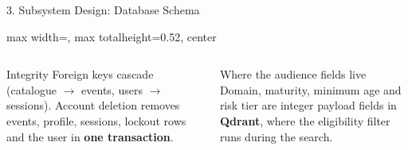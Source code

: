 \documentclass[aspectratio=169, 11pt]{beamer}
\begin{document}
\begin{frame}{3. Subsystem Design: Database Schema}
\begin{adjustbox}{max width=\textwidth, max totalheight=0.52\textheight, center}
\end{adjustbox}

    \vspace{0.2cm}
    \begin{columns}[T]
        \begin{block}{Integrity}
            \scriptsize Foreign keys cascade (catalogue $\rightarrow$ events, users $\rightarrow$ sessions). Account deletion removes events, profile, sessions, lockout rows and the user in \textbf{one transaction}.
        \end{block}
        \begin{block}{Where the audience fields live}
            \scriptsize Domain, maturity, minimum age and risk tier are integer payload fields in \textbf{Qdrant}, where the eligibility filter runs during the search.
        \end{block}
    \end{columns}
\end{frame}
\end{document}
